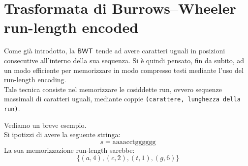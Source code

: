 \section{Trasformata di Burrows--Wheeler run-length encoded}
Come già introdotto, la $\mbox{\rm {\sf BWT}}$ tende ad avere caratteri uguali in
posizioni consecutive all'interno della sua sequenza. Si è quindi 
pensato, fin da subito, ad un modo efficiente per memorizzare in modo compresso
testi mediante l'uso del run-length encoding. \\
Tale tecnica consiste nel
memorizzare le cosiddette run, ovvero sequenze massimali di caratteri
uguali, mediante coppie \texttt{(carattere, lunghezza della run)}.
\begin{esempio}
  Vediamo un breve esempio.\\
  Si ipotizzi di avere la seguente stringa:
  \[s=\mbox{aaaacctgggggg}\]
  La sua memorizzazione run-length sarebbe:
  \[\{(a,4),(c,2),(t,1),(g,6)\}\]
\end{esempio}
